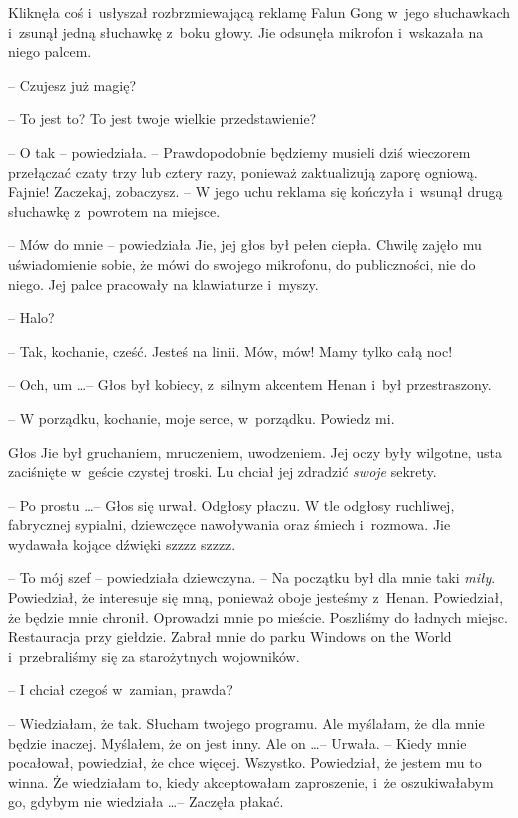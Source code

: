\documentclass[oneside,polish,11pt,rmheadings]{mwbk}
\begin{document}
Kliknęła coś i~usłyszał rozbrzmiewającą reklamę Falun Gong w~jego słuchawkach i~zsunął jedną słuchawkę z~boku głowy. Jie odsunęła mikrofon i~wskazała na niego palcem.

 -- Czujesz już magię?

-- To jest to? To jest twoje wielkie przedstawienie? 

-- O tak -- powiedziała. -- Prawdopodobnie będziemy musieli dziś wieczorem przełączać czaty trzy lub cztery razy, ponieważ zaktualizują zaporę ogniową. Fajnie! Zaczekaj, zobaczysz. -- W jego uchu reklama się kończyła i~wsunął drugą słuchawkę z~powrotem na miejsce.

-- Mów do mnie -- powiedziała Jie, jej głos był pełen ciepła. Chwilę zajęło mu uświadomienie sobie, że mówi do swojego mikrofonu, do publiczności, nie do niego. Jej palce pracowały na klawiaturze i~myszy.

-- Halo? 

-- Tak, kochanie, cześć. Jesteś na linii. Mów, mów! Mamy tylko całą noc!

-- Och, um \ldots  -- Głos był kobiecy, z~silnym akcentem Henan i~był przestraszony.

-- W porządku, kochanie, moje serce, w~porządku. Powiedz mi. 

Głos Jie był gruchaniem, mruczeniem, uwodzeniem. Jej oczy były wilgotne, usta zaciśnięte w~geście czystej troski. Lu chciał jej zdradzić \textit{swoje }sekrety.

-- Po prostu \ldots  -- Głos się urwał. Odgłosy płaczu. W tle odgłosy ruchliwej, fabrycznej sypialni, dziewczęce nawoływania oraz śmiech i~rozmowa. Jie wydawała kojące dźwięki szzzz szzzz. 

-- To mój szef -- powiedziała dziewczyna. -- Na początku był dla mnie taki \textit{miły}. Powiedział, że interesuje się mną, ponieważ oboje jesteśmy z~Henan. Powiedział, że będzie mnie chronił. Oprowadzi mnie po mieście. Poszliśmy do ładnych miejsc. Restauracja przy giełdzie. Zabrał mnie do parku Windows on the World i~przebraliśmy się za starożytnych wojowników.

-- I chciał czegoś w~zamian, prawda?

-- Wiedziałam, że tak. Słucham twojego programu. Ale myślałam, że dla mnie będzie inaczej. Myślałem, że on jest inny. Ale on \ldots  -- Urwała. -- Kiedy mnie pocałował, powiedział, że chce więcej. Wszystko. Powiedział, że jestem mu to winna. Że wiedziałam to, kiedy akceptowałam zaproszenie, i~że oszukiwałabym go, gdybym nie wiedziała \ldots  -- Zaczęła płakać.
\end{document}
